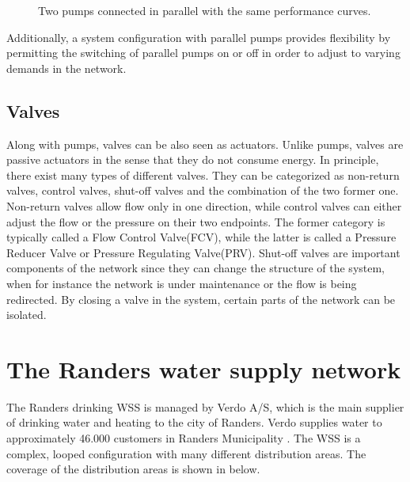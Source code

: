 \begin{figure}[H]
\centering
 
\caption{Two pumps connected in parallel with the same performance curves.}
\label{fig:parallelpumpcurve}
\end{figure}

\vspace{-3mm}

Additionally, a system configuration with parallel pumps provides flexibility by permitting the switching of parallel pumps on or off in order to adjust to varying demands in the network. 

\subsection{Valves}
\label{valves}

Along with pumps, valves can be also seen as actuators. Unlike pumps, valves are passive actuators in the sense that they do not consume energy. In principle, there exist many types of different valves. They can be categorized as non-return valves, control valves, shut-off valves and the combination of the two former one. Non-return valves allow flow only in one direction, while control valves can either adjust the flow or the pressure on their two endpoints. The former category is typically called a Flow Control Valve(FCV), while the latter is called a Pressure Reducer Valve or Pressure Regulating Valve(PRV). Shut-off valves are important components of the network since they can change the structure of the system, when for instance the network is under maintenance or the flow is being redirected. By closing a valve in the system, certain parts of the network can be isolated.

\newpage

\section{The Randers water supply network}
\label{the_randers_water_supply_network}

The Randers drinking WSS is managed by Verdo A/S, which is the main supplier of drinking water and heating to the city of Randers. Verdo supplies water to approximately 46.000 customers in Randers Municipality \cite{verdo}. The WSS is a complex, looped configuration with many different distribution areas. The coverage of the distribution areas is shown in  below.

